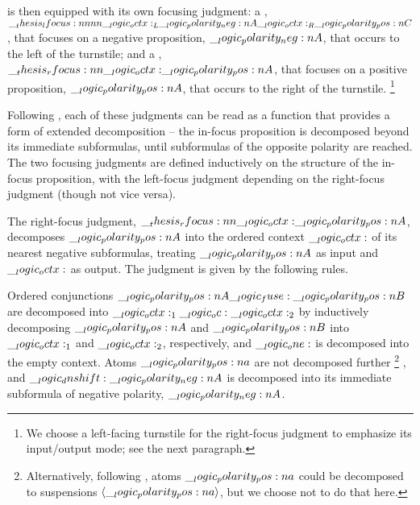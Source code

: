  is then equipped with its own focusing judgment: a , $\__thesis_lfocus:nnnn {\__logic_octx:_L} {\__logic_polarity_neg:n {A}} {\__logic_octx:_R} {\__logic_polarity_pos:n {C}}$, that focuses on a negative proposition, $\__logic_polarity_neg:n {A}$, that occurs to the left of the turnstile; and a , $\__thesis_rfocus:nn {\__logic_octx:} {\__logic_polarity_pos:n {A}}$, that focuses on a positive proposition, $\__logic_polarity_pos:n {A}$, that occurs to the right of the turnstile.%
\footnote{We choose a left-facing turnstile for the right-focus judgment to emphasize its input/output mode; see the next paragraph.}

Following \textcite{Zeilberger:??}, each of these judgments can be read as a function that provides a form of extended decomposition -- the in-focus proposition is decomposed beyond its immediate subformulas, until subformulas of the opposite polarity are reached.
% 
The two focusing judgments are defined inductively on the structure of the in-focus proposition, with the left-focus judgment depending on the right-focus judgment (though not vice versa).

The right-focus judgment, $\__thesis_rfocus:nn {\__logic_octx:} {\__logic_polarity_pos:n {A}}$, decomposes $\__logic_polarity_pos:n {A}$ into the ordered context $\__logic_octx:$ of its nearest negative subformulas, treating $\__logic_polarity_pos:n {A}$ as input and $\__logic_octx:$ as output.%
The judgment is given by the following rules.
Ordered conjunctions $\__logic_polarity_pos:n {A} \__logic_fuse: \__logic_polarity_pos:n {B}$ are decomposed into $\__logic_octx:_1 \__logic_oc: \__logic_octx:_2$ by inductively decomposing $\__logic_polarity_pos:n {A}$ and $\__logic_polarity_pos:n {B}$ into $\__logic_octx:_1$ and $\__logic_octx:_2$, respectively, and $\__logic_one:$ is decomposed into the empty context.
Atoms $\__logic_polarity_pos:n {a}$ are not decomposed further%
\footnote{Alternatively, following \textcite{Simmons:CMU12}, atoms $\__logic_polarity_pos:n {a}$ could be decomposed to suspensions $\langle\__logic_polarity_pos:n {a}\rangle$, but we choose not to do that here.}%
, and $\__logic_dnshift: \__logic_polarity_neg:n {A}$ is decomposed into its immediate subformula of negative polarity, $\__logic_polarity_neg:n {A}$.

